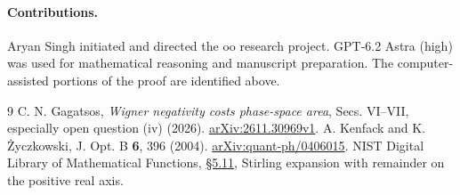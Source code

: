 \documentclass[11pt]{article}
\begin{document}
\paragraph{Contributions.}
Aryan Singh initiated and directed the oo research project. GPT-6.2 Astra (high) was used for mathematical reasoning and manuscript preparation. The computer-assisted portions of the proof are identified above.

\begin{thebibliography}{9}
 C. N. Gagatsos, \emph{Wigner negativity costs phase-space area}, Secs. VI--VII, especially open question (iv) (2026). \href{https://arxiv.org/abs/2611.30969}{arXiv:2611.30969v1}.
 A. Kenfack and K. {\.{Z}}yczkowski, J. Opt. B \textbf{6}, 396 (2004). \href{https://arxiv.org/abs/quant-ph/0406015}{arXiv:quant-ph/0406015}.
 NIST Digital Library of Mathematical Functions, \href{https://dlmf.nist.gov/5.11}{\S5.11}, Stirling expansion with remainder on the positive real axis.
\end{thebibliography}
\end{document}
